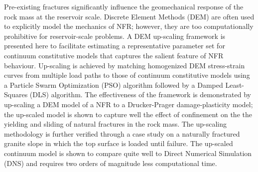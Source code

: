 Pre-existing fractures significantly influence the geomechanical response of the rock mass at the reservoir scale.  Discrete Element Methods (DEM) are often used to explicitly model the mechanics of NFR; however, they are too computationally prohibitive for reservoir-scale problems. A DEM up-scaling framework is presented here to facilitate estimating a representative parameter set for continuum constitutive models that captures the salient feature of NFR behaviour. Up-scaling is achieved by matching homogenized DEM stress-strain curves from multiple load paths to those of continuum constitutive models using a Particle Swarm Optimization (PSO) algorithm followed by a Damped Least-Squares (DLS) algorithm. The effectiveness of the framework is demonstrated by up-scaling a DEM model of a NFR to a Drucker-Prager damage-plasticity model; the up-scaled model is shown to capture well the effect of confinement on the the yielding and sliding of natural fractures in the rock mass. The up-scaling methodology is further verified through a case study on a naturally fractured granite slope in which the top surface is loaded until failure. The up-scaled continuum model is shown to compare quite well to Direct Numerical Simulation (DNS) and requires two orders of magnitude less computational time.